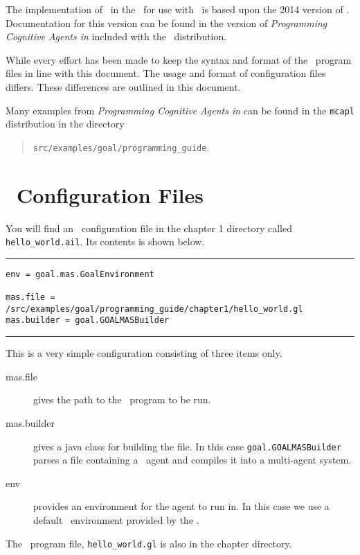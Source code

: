 The implementation of \goal\ in the \ail\ for use with \ajpf\ is based upon the 2014 version of \goal.  Documentation for this version can be found in the version of \emph{Programming Cognitive Agents in \goal} included with the \ajpf\ distribution.

While every effort has been made to keep the syntax and format of the \goal\ program files in line with this document.  The usage and format of configuration files differs.  These differences are outlined in this document.

Many examples from \emph{Programming Cognitive Agents in \goal} can be found in the \texttt{mcapl} distribution in the directory
\begin{quote}
  \texttt{src/examples/goal/programming\_guide}.
\end{quote}

\section{\ail\ Configuration Files}
\label{sec:config}

\begin{sloppypar}
  You will find an \ail\ configuration file in the chapter 1 directory called \texttt{hello\_world.ail}.  Its contents is shown below.
  \end{sloppypar}

\noindent\rule{\textwidth}{1pt}
\begin{small}
\begin{verbatim}
env = goal.mas.GoalEnvironment

mas.file = /src/examples/goal/programming_guide/chapter1/hello_world.gl
mas.builder = goal.GOALMASBuilder
\end{verbatim}
\end{small}
\rule{\textwidth}{1pt}

This is a very simple configuration consisting of three items only.
\begin{sloppypar}
\begin{description}
\item[mas.file] gives the path to the \goal\ program to be run.
\item[mas.builder] gives a java class for building the file.  In this case \texttt{goal.GOALMASBuilder} parses a file containing a \goal\ agent and compiles it into a multi-agent system.
\item[env] provides an environment for the agent to run in.  In this case we use a default \goal\ environment provided by the \ail.
\end{description}
\end{sloppypar}
The \goal\ program file, \texttt{hello\_world.gl} is also in the chapter directory.

